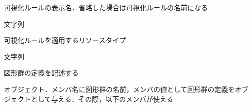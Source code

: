 \begin{description}
{\nopagebreak
\item[\texttt{DisplayName}] \mbox{}
    \vspace{-1zw}
    \begin{description}
    \setlength{\itemsep}{-1.5\itemsep}
    \item[説明] 可視化ルールの表示名．省略した場合は可視化ルールの名前になる
    \item[値] 文字列
    \end{description}
}{\nopagebreak
\item[\texttt{Target}] \mbox{}
    \vspace{-1zw}
    \begin{description}
    \setlength{\itemsep}{-1.5\itemsep}
    \item[説明] 可視化ルールを適用するリソースタイプ
    \item[値] 文字列
    \end{description}
}
\clearpage
{\nopagebreak
\item[\texttt{Shapes}] \mbox{}
    \vspace{-1zw}
    \begin{description}
    \setlength{\itemsep}{-1.5\itemsep}
    \item[説明] 図形群の定義を記述する
    \item[値] オブジェクト．メンバ名に図形群の名前，メンバの値として図形群の定義をオブジェクトとして与える．その際，以下のメンバが使える


\end{description}}
\end{description}
